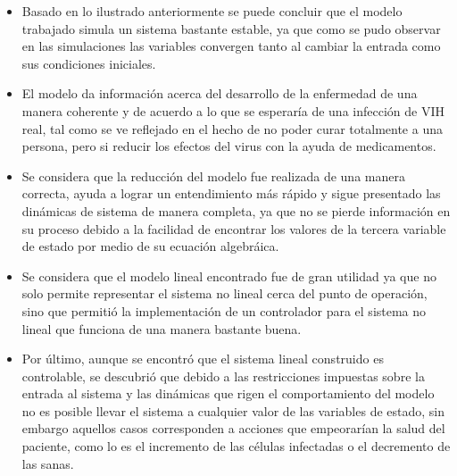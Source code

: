 \documentclass{article}
\begin{document}
\begin{itemize}
    \item Basado en lo ilustrado anteriormente se puede concluir que el modelo
    trabajado simula un sistema bastante estable, ya que como se pudo observar en
    las simulaciones las variables convergen tanto al cambiar la entrada como
    sus condiciones iniciales.

    \item El modelo da información acerca del desarrollo de la enfermedad
    de una manera coherente y de acuerdo a lo que se esperaría de una infección
    de VIH real, tal como se ve reflejado en el hecho de no poder curar totalmente
    a una persona, pero si reducir los efectos del virus con la ayuda de medicamentos.

    \item Se considera que la reducción del modelo fue realizada de
    una manera correcta, ayuda a lograr un entendimiento más rápido y sigue
    presentado las dinámicas de sistema de manera completa, ya que no se pierde
    información en su proceso debido a la facilidad de encontrar los valores de
    la tercera variable de estado por medio de su ecuación algebráica.

    \item Se considera que el modelo lineal encontrado fue de gran utilidad ya
    que no solo permite representar el sistema no lineal cerca del punto de
    operación, sino que permitió la implementación de un controlador para el sistema
    no lineal que funciona de una manera bastante buena.

    \item Por último, aunque se encontró que el sistema lineal construido es
    controlable, se descubrió que debido a las restricciones impuestas sobre la
    entrada al sistema y las dinámicas que rigen el comportamiento del modelo
    no es posible llevar el sistema a cualquier valor de las variables de
    estado, sin embargo aquellos casos corresponden a acciones que empeorarían
    la salud del paciente, como lo es el incremento de las células infectadas o
    el decremento de las sanas.
\end{itemize}



\end{document}
